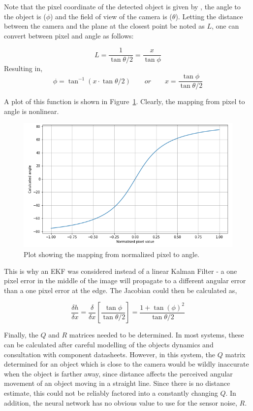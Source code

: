 Note that the pixel coordinate of the detected object is given by , the angle to the object is  ($\phi$) and the field of view of the camera is  ($\theta$). Letting the distance between the camera and the plane at the closest point be noted as $L$, one can convert between pixel and angle as follows:

\[ L = \frac{1}{\tan{\theta/2}} = \frac{x}{\tan{\phi}} \]
Resulting in,
\[ \phi = \tan^{-1}{\left( x\cdot{}\tan{ \theta/2 } \right) }
\qquad or
\qquad x = \frac{\tan{\phi}}{\tan{\theta/2}} \]

A plot of this function is shown in Figure~\ref{fig:pixel_to_angle_plot}. Clearly, the mapping from pixel to angle is nonlinear.

\begin{figure}[h!]
  \centering
  \includegraphics[width=\textwidth]{methodology/pixel_to_angle_plot}
  \caption{\label{fig:pixel_to_angle_plot}Plot showing the mapping from normalized pixel to angle.}
\end{figure}

This is why an EKF was considered instead of a linear Kalman Filter - a one pixel error in the middle of the image will propagate to a different angular error than a one pixel error at the edge. The Jacobian could then be calculated as,

\[ \frac{\delta h}{\delta x} = \frac{\delta}{\delta x} \left[ \frac{\tan{\phi}}{\tan{\theta/2}} \right] = \frac{1 + \tan{(\phi)}^2}{\tan{\theta/2}} \]

Finally, the $Q$ and $R$ matrices needed to be determined. In most systems, these can be calculated after careful modelling of the objects dynamics and consultation with component datasheets. However, in this system, the $Q$ matrix determined for an object which is close to the camera would be wildly inaccurate when the object is farther away, since distance affects the perceived angular movement of an object moving in a straight line. Since there is no distance estimate, this could not be reliably factored into a constantly changing $Q$. In addition, the neural network has no obvious value to use for the sensor noise, $R$.

